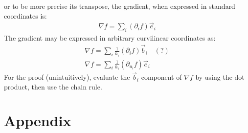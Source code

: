 \documentclass{article}
\theoremstyle{definition}
\begin{document}
or to be more precise its transpose, the gradient, when expressed in standard coordinates is:
\begin{align*}
	\nabla f=\sum_{i}(\partial_if)\vec e_i
\end{align*}
The gradient may be expressed in arbitrary curvilinear coordinates as:
\begin{align*}
	\nabla f=\sum_i\frac{1}{h_i}(\partial_if)\vec b_i\quad(?)\\
	\nabla f=\sum_i\frac{1}{h_i}(\partial_{u_i}f)\vec e_i
\end{align*}
For the proof (unintuitively), evaluate the $\vec b_i$ component of $\nabla f$ by using the dot product, then use the chain rule.

\newpage
\appendix
\section{Appendix}
\end{document}
